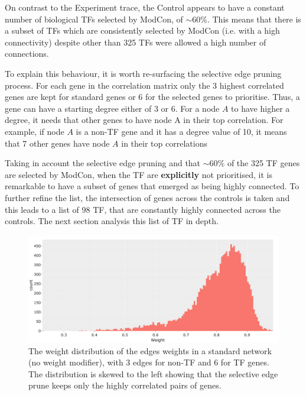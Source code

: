 On contrast to the Experiment trace, the Control appears to have a constant number of biological TFs selected by ModCon, of $\sim60\%$. This means that there is a subset of TFs which are consistently selected by ModCon (i.e. with a high connectivity) despite other than 325 TFs were allowed a high number of connections. 

To explain this behaviour, it is worth re-surfacing the selective edge pruning process. For each gene in the correlation matrix only the 3 highest correlated genes are kept for standard genes or 6 for the selected genes to prioritise. Thus, a gene can have a starting degree either of 3 or 6. For a node $A$ to have higher a degree, it needs that other genes to have node A in their top correlation. For example, if node $A$ is a non-TF gene and it has a degree value of 10, it means that 7 other genes have node $A$ in their top correlations

Taking in account the selective edge pruning and that $\sim60\%$ of the 325 TF genes are selected by ModCon, when the TF are \textbf{explicitly} not prioritised, it is remarkable to have a subset of genes that emerged as being highly connected. To further refine the list, the intersection of genes across the controls is taken and this leads to a list of 98 TF, that are constantly highly connected across the controls. The next section analysis this list of TF in depth. 

\begin{figure}[!ht]   
\centering
\includegraphics[width=1.0\textwidth,height=1.0\textheight,keepaspectratio]{Sections/Network_I/Resources/selective_pruning/weight_distrib.png}
  \caption{The weight distribution of the edges weights in a standard network (no weight modifier), with 3 edges for non-TF and 6 for TF genes. The distribution is skewed to the left showing that the selective edge prune keeps only the highly correlated pairs of genes.}
\label{fig:N_I:weight_distrib}
\end{figure}


